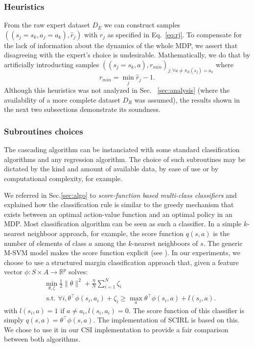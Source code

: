 \documentclass[smallextended]{svjour3}
\begin{document}
\subsubsection{Heuristics}
\label{subsubsec:heuristics}
From the raw expert dataset $D_E$ we can construct samples $((s_j=s_k,a_j=a_k),\hat r_j)$ with $\hat r_j$ as specified in Eq.~\ref{eq:rj}. To compensate for the lack of information about the dynamics of the whole MDP, we assert that disagreeing with the expert's choice is undesirable. Mathematically, we do that by artificially introducting samples $((s_j=s_k,a),r_{min})_{j;\forall a\neq \pi_E(s_j) = a_k}$ where
\begin{equation}
  r_{min} = \min_j\hat r_j - 1.
\end{equation}
Although this heuristics was not analyzed in Sec.~ \ref{sec:analysis} (where the availability of a more complete dataset $D_R$ was assumed), the results shown in the next two subsections demonstrate its soundness.
\subsubsection{Subroutines choices}
\label{subsubsec:subroutines}
The cascading algorithm can be instanciated with some standard classification algorithms and any regression algorithm. The choice of such subroutines may be dictated by the kind and amount of available data, by ease of use or by computational complexity, for example.

We referred in Sec.\ref{sec:algo} to \emph{score-function based multi-class classifiers} and explained how the classification rule is similar to the greedy mechanism that exists between an optimal action-value function and an optimal policy in an MDP. Most classification algorithm can be seen as such a classifier. In a simple $k$-nearest neighboor approach, for example, the score function $q(s,a)$ is the number of elements of class $a$ among the $k$-nearest neighboors of $s$. The generic M-SVM model makes the score function explicit (see \cite{guermeur2011generic}). In our experiments, we choose to use a structured margin classification approach \cite{taskar2005learning} that, given a feature vector $\phi: S\times A \rightarrow \mathbb{R}^p$ solves:
\begin{eqnarray*}
  &\min_{\theta,\zeta}\frac{1}{2}\|\theta\|^2 +
  \frac{\eta}{N}\sum_{i=1}^N \zeta_i \\
  &\text{~s.t.~} \forall i,
  \theta^\top{\phi}(s_i,a_i)+\zeta_i \geq \max_a \theta^\top
  {\phi}(s_i,a) + l(s_i,a). \label{eq:qp_taskar}
\end{eqnarray*}
with $l(s_i,a) = 1\textrm{ if } a\neq a_i,l(s_i,a_i)=0$. The score function of this classifier is simply $q(s,a) = \theta^\top \phi(s,a)$. The implementation of SCIRL \cite{klein2012scirl} is based on this. We chose to use it in our CSI implementation to provide a fair comparison between both algorithms.
\end{document}
